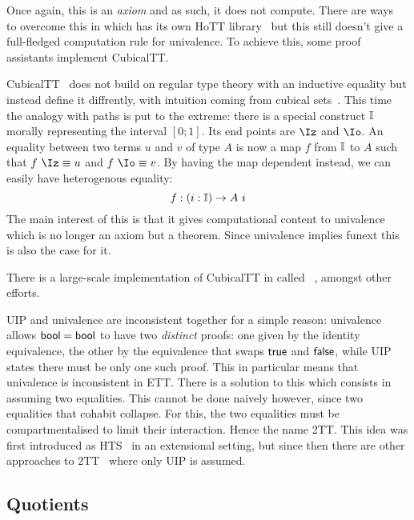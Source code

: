 Once again, this is an \emph{axiom} and as such, it does not compute.
There are ways~ to overcome this in
\Coq which has its own \acrshort{HoTT} library~
but this still doesn't give a full-fledged computation rule for univalence.
To achieve this, some proof assistants implement \acrlong{CubicalTT}.

 \acrshort{CubicalTT}~
does not build on regular type theory with an inductive equality but instead
define it diffrently, with intuition coming from cubical
sets~.
This time the analogy with paths is put to the extreme: there is a special
construct \(\mathbb{I}\) morally representing the interval \([0;1]\). Its end points
are \(\Iz\) and \(\Io\).
An equality between two terms \(u\) and \(v\) of type \(A\) is now a map \(f\)
from \(\mathbb{I}\) to \(A\) such that \(f\ \Iz \equiv u\) and \(f\ \Io \equiv v\).
By having the map dependent instead, we can easily have heterogenous equality:
\[
  f : (i : \mathbb{I}) \to A\ i
\]
The main interest of this is that it gives computational content to univalence
which is no longer an axiom but a theorem. Since univalence implies
\acrshort{funext} this is also the case for it.

There is a large-scale implementation of \acrshort{CubicalTT} in
\Agda called ~,
amongst other efforts.


\acrshort{UIP} and univalence are inconsistent together for a simple reason:
univalence allows \(\mathsf{bool} = \mathsf{bool}\) to have two \emph{distinct} proofs: one
given by the identity equivalence, the other by the equivalence that swaps
\(\mathsf{true}\) and \(\mathsf{false}\), while \acrshort{UIP} states there must be only one
such proof.
This in particular means that univalence is inconsistent in \acrshort{ETT}.
There is a solution to this which consists in assuming two equalities.
This cannot be done naively however, since two equalities that cohabit
collapse.
For this, the two equalities must be compartmentalised to limit their
interaction. Hence the name \acrfull{2TT}.
This idea was first introduced as \acrfull{HTS}~ in
an extensional setting, but since then there are other approaches to
\acrshort{2TT}~
where only \acrshort{UIP} is assumed.

\subsection{Quotients}

